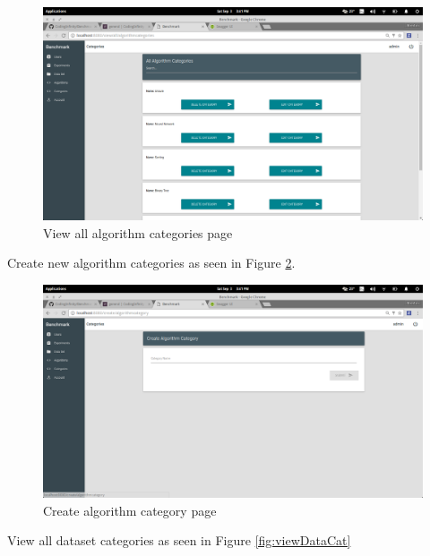 \documentclass[11pt,a4paper]{article}
\begin{document}
\begin{figure}[H]
	\begin{center}
		\includegraphics[scale=0.3]{../Images/User Manual/View Algorithm Categories.png}
		\caption{View all algorithm categories page}
		\label{fig:viewAlCat}
	\end{center}  
\end{figure}
\clearpage
Create new algorithm categories as seen in Figure \ref{fig:createAlCat}.
\begin{figure}[H]
	\begin{center}
		\includegraphics[scale=0.3]{../Images/User Manual/Create Algorithm Category.png}
		\caption{Create algorithm category page}
		\label{fig:createAlCat}
	\end{center}  
\end{figure}
\clearpage
View all dataset categories as seen in Figure \ref{fig:viewDataCat}
\end{document}
